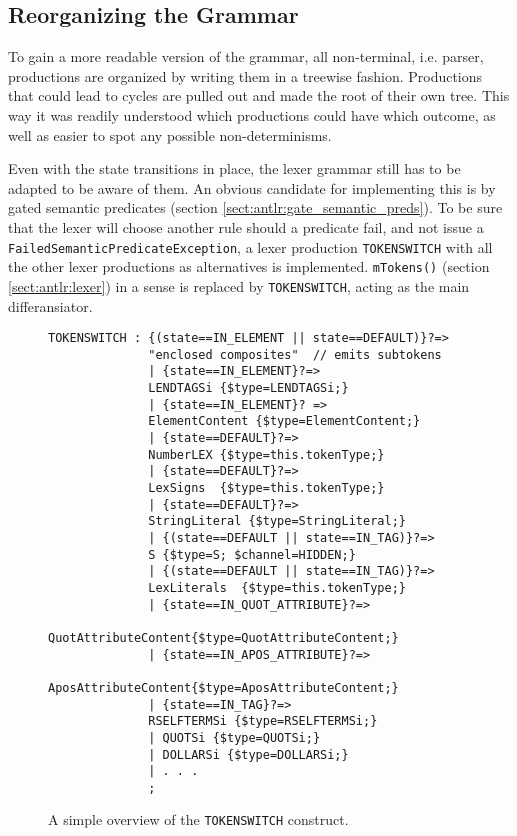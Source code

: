 \subsection{Reorganizing the Grammar}
\label{sect:rewriteGrammar:reorganizing}

To gain a more readable version of the grammar, all non-terminal, i.e. parser, productions are organized by writing them in a treewise fashion. Productions that could lead to cycles are pulled out and made the root of their own tree. This way it was readily understood which productions could have which outcome, as well as easier to spot any possible non-determinisms.

Even with the state transitions in place, the lexer grammar still has to be adapted to be aware of them. An obvious candidate for implementing this is by gated semantic predicates (section \ref{sect:antlr:gate_semantic_preds}). To be sure that the lexer will choose another rule should a predicate fail, and not issue a \verb!FailedSemanticPredicateException!, a lexer production \verb!TOKENSWITCH! with all the other lexer productions as alternatives is implemented. \verb!mTokens()! (section \ref{sect:antlr:lexer}) in a sense is replaced by \verb!TOKENSWITCH!, acting as the main differansiator. 

\begin{figure}[h!]
\begin{Verbatim}
TOKENSWITCH : {(state==IN_ELEMENT || state==DEFAULT)}?=>
              "enclosed composites"  // emits subtokens
              | {state==IN_ELEMENT}?=>
              LENDTAGSi {$type=LENDTAGSi;}
              | {state==IN_ELEMENT}? =>
              ElementContent {$type=ElementContent;} 
              | {state==DEFAULT}?=>
              NumberLEX {$type=this.tokenType;}
              | {state==DEFAULT}?=>
              LexSigns  {$type=this.tokenType;}
              | {state==DEFAULT}?=>
              StringLiteral {$type=StringLiteral;}
              | {(state==DEFAULT || state==IN_TAG)}?=>
              S {$type=S; $channel=HIDDEN;}
              | {(state==DEFAULT || state==IN_TAG)}?=>
              LexLiterals  {$type=this.tokenType;} 
              | {state==IN_QUOT_ATTRIBUTE}?=>
              QuotAttributeContent{$type=QuotAttributeContent;}
              | {state==IN_APOS_ATTRIBUTE}?=>
              AposAttributeContent{$type=AposAttributeContent;}
              | {state==IN_TAG}?=>
              RSELFTERMSi {$type=RSELFTERMSi;}
              | QUOTSi {$type=QUOTSi;}
              | DOLLARSi {$type=DOLLARSi;}
              | . . .
              ;

\end{Verbatim}
\caption[Overview of the \texttt{TOKENSWITCH} construct]{A simple overview of the \texttt{TOKENSWITCH} construct.}
\label{fig:tokenswitch}
\end{figure}

